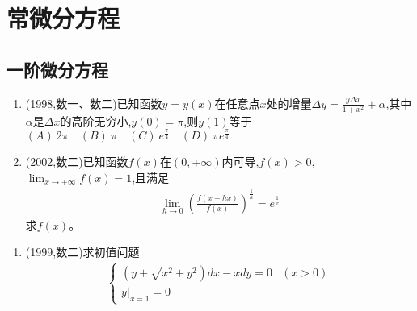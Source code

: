 \documentclass[12pt, a4paper, oneside, UTF8]{ctexbook}
\begin{document}

\else
\fi

\chapter{常微分方程}
\section{一阶微分方程}

\begin{enumerate}[label=\arabic*.]
    \item (1998,数一、数二)已知函数$y=y(x)$在任意点$x$处的增量$\Delta y=\frac{y\Delta x}{1+x^2}+\alpha$,其中$\alpha$是$\Delta x$的高阶无穷小,$y(0)=\pi$,则$y(1)$等于 \\
    $(A)\ 2\pi \quad (B)\ \pi \quad (C)\ e^{\frac{\pi}{4}} \quad (D)\ \pi e^{\frac{\pi}{4}}$

    \begin{solution}
    \newpage
    \end{solution}
    
    \item (2002,数二)已知函数$f(x)$在$(0,+\infty)$内可导,$f(x)>0$,$\lim_{x\to+\infty}f(x)=1$,且满足
    \begin{align*}
        \lim_{h\to0}\left(\frac{f(x+hx)}{f(x)}\right)^{\frac{1}{h}}=e^{\frac{1}{x}}
    \end{align*}
    求$f(x)$。
    
    \begin{solution}
    \newpage
    \end{solution}
\end{enumerate}

\begin{enumerate}[label=\arabic*.,start=3]
    \item (1999,数二)求初值问题
    \begin{align*}
        \begin{cases}
            (y+\sqrt{x^2+y^2})dx-xdy=0 & (x>0) \\
            y|_{x=1}=0
        \end{cases}
    \end{align*}
    
    \begin{solution}
    \newpage
    \end{solution}
\end{enumerate}
\end{document}
